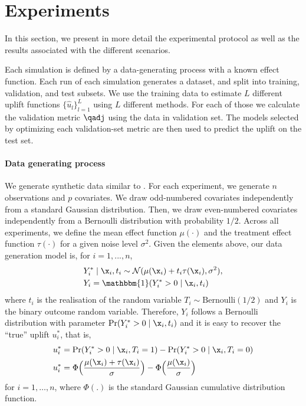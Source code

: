 
\section{Experiments}
\label{sec:appendix_experiments}


In this section, we present in more detail the experimental protocol as well as the results associated with the different scenarios.


Each simulation is defined by a data-generating process with a known effect function. Each run of each simulation generates a dataset, and split into training, validation, and test subsets. We use the training data to estimate $L$ different uplift functions $\{\hat{u}_l\}_{l=1}^L$ using $L$ different methods. For each of those we calculate the validation metric $\qadj$ using the data in validation set. The models selected by optimizing each validation-set metric are then used to predict the uplift on the test set.

\paragraph{Data generating process}

We generate synthetic data similar  to  \cite{powers2018some}. For each experiment, we generate $n$ observations and $p$ covariates. We draw odd-numbered covariates independently from a standard Gaussian distribution. Then, we draw even-numbered covariates independently from a Bernoulli distribution with probability $1/2$. Across all experiments, we define the mean effect function $\mu(\cdot)$ and the treatment effect function $\tau(\cdot)$ for a given noise level $\sigma^2$. Given the elements above, our data generation model is, for $i=1,...,n$,
\begin{align*}
    &Y_i^* \mid \x_i, t_i \sim \mathcal{N}(\mu(\x_i) + t_i\tau(\x_i), \sigma^2),\\
    &Y_i = \mathbbm{1}(Y_i^* > 0 \mid \x_i, t_i)
\end{align*}
where $t_i$ is the realisation of the random variable $T_i \sim \mathrm{Bernoulli}(1/2)$ and $Y_i$ is the binary outcome random variable. Therefore, $Y_i$ follows a Bernoulli distribution with parameter $\mathrm{Pr}(Y_i^* > 0 \mid \x_i, t_i)$ and it is easy to recover the ``true'' uplift $u_i^*$, that is,
\begin{align}
    u_i^* &= \mathrm{Pr}(Y_i^* > 0 \mid \x_i, T_i = 1) - \mathrm{Pr}(Y_i^* > 0 \mid \x_i, T_i = 0) \nonumber \\
    u_i^* &= \Phi \Bigl( \frac{\mu(\x_i) + \tau(\x_i)}{\sigma} \Bigr) - \Phi \Big( \frac{\mu(\x_i)}{\sigma} \Big) \label{eq:sim_true_uplift}
\end{align}
for $i=1,\ldots,n$, where $\Phi(.)$ is the standard Gaussian cumulative distribution function.

